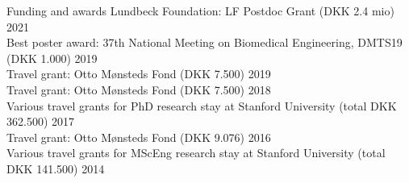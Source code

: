 
\begin{rSection}{Funding and awards}
    Lundbeck Foundation: LF Postdoc Grant (DKK 2.4 mio) \hfill {2021} \\
    Best poster award: 37th National Meeting on Biomedical Engineering, DMTS19 (DKK 1.000) \hfill {2019} \\
    Travel grant: Otto Mønsteds Fond (DKK 7.500) \hfill {2019} \\
    Travel grant: Otto Mønsteds Fond (DKK 7.500) \hfill {2018} \\ 
    Various travel grants for PhD research stay at Stanford University (total DKK 362.500) \hfill {2017} \\
    Travel grant: Otto Mønsteds Fond (DKK 9.076) \hfill {2016} \\ 
    Various travel grants for MScEng research stay at Stanford University (total DKK 141.500) \hfill {2014} \\
    

    

\end{rSection}
